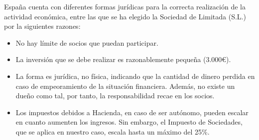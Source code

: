 España cuenta con diferentes formas jurídicas para la correcta realización de la actividad económica, entre las que se ha elegido la Sociedad de Limitada (S.L.) por la siguientes razones:

\begin{itemize}
    \item No hay límite de socios que puedan participar.
    \item La inversión que se debe realizar es razonablemente pequeña (3.000€).
    \item La forma es jurídica, no física, indicando que la cantidad de dinero perdida en caso de empeoramiento de la situación financiera. Además, no existe un dueño como tal, por tanto, la responsabilidad recae en los socios.
    \item Los impuestos debidos a Hacienda, en caso de ser autónomo, pueden escalar en cuanto aumenten los ingresos. Sin embargo, el Impuesto de Sociedades, que se aplica en nuestro caso, escala hasta un máximo del 25\%.
\end{itemize}





